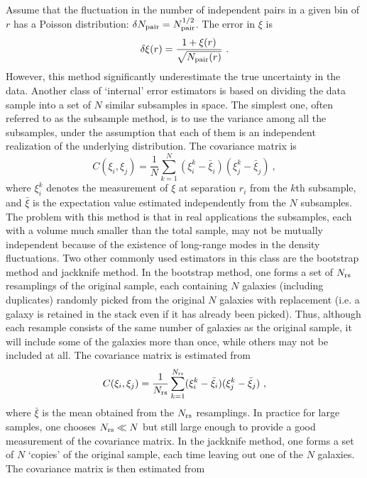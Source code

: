 \documentclass[12pt,a4paper]{article}
\begin{document}
Assume that the fluctuation in the number of independent pairs in a given bin of $r$ has a Poisson distribution: $\delta N_{\rm pair} = N^{1/2}_{\rm pair}$. The error in $\xi$ is
\begin{equation}
\delta \xi(r) = \frac{1+\xi(r)}{\sqrt{N_{\rm pair}(r)}} ~.
\end{equation}
However, this method significantly underestimate the true uncertainty in the data. Another class of `internal' error estimators is based on dividing the data sample into a set of $N$ similar subsamples in space. The simplest one, often referred to as the subsample method, is to use the variance among all the subsamples, under the assumption that each of them is an independent realization of the underlying distribution. The covariance matrix is 
\begin{equation}
C(\xi_i, \xi_j) = \frac{1}{N} \sum_{k=1}^N (\xi_i^k -\bar{\xi}_i) (\xi_j^k -\bar{\xi}_j) ~,
\end{equation}
where $\xi_i^k$ denotes the measurement of $\xi$ at separation $r_i$ from the $k$th subsample, and $\bar{\xi}$ is the expectation value estimated independently from the $N$ subsamples. The problem with this method is that in real applications the subsamples, each with a volume much smaller than the total sample, may not be mutually independent because of the existence of long-range modes in the density fluctuations. Two other commonly used estimators in this class are the bootstrap method and jackknife method. In the bootstrap method, one forms a set of $N_{\rm rs}$ resamplings of the original sample, each containing $N$ galaxies (including duplicates) randomly picked from the original $N$ galaxies with replacement (i.e. a galaxy is retained in the stack even if it has already been picked). Thus, although each resample consists of the same number of galaxies as the original sample, it will include some of the galaxies more than once, while others may not be included at all. The covariance matrix is estimated from
\begin{equation}
C(\xi_i, \xi_j) = \frac{1}{N_{\rm rs}} \sum_{k=1}^{N_{\rm rs}} (\xi_i^k -\bar{\xi}_i) (\xi_j^k -\bar{\xi}_j) ~,
\end{equation}
where $\bar{\xi}$ is the mean obtained from the $N_{\rm rs}$ resamplings. In practice for large samples, one chooses $N_{\rm rs} \ll  N$ but still large enough to provide a good measurement of the covariance matrix. In the jackknife method, one forms a set of $N$ `copies' of the original sample, each time leaving out one of the $N$ galaxies. The covariance matrix is then estimated from
\end{document}
